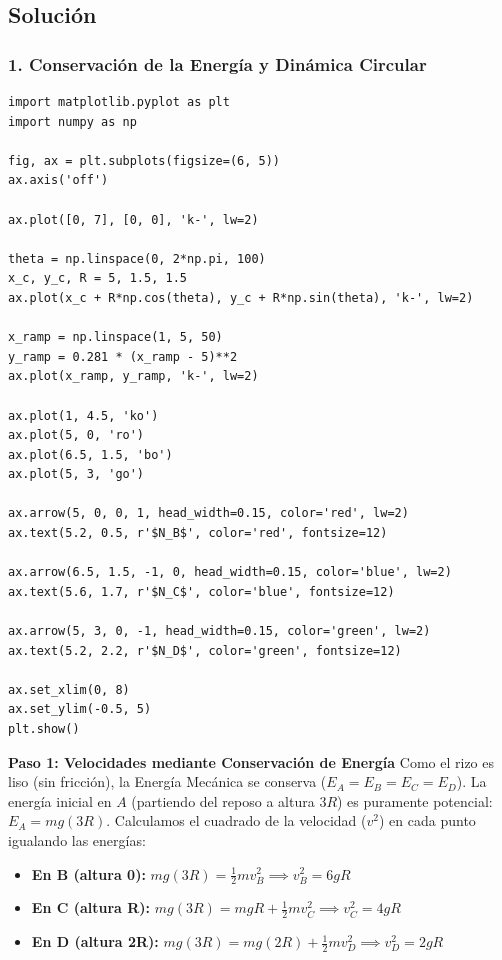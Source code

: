 \documentclass[12pt, a4paper]{article}
\begin{document}
\subsection*{Solución}

\subsubsection*{1. Conservación de la Energía y Dinámica Circular}

\begin{verbatim}
import matplotlib.pyplot as plt
import numpy as np

fig, ax = plt.subplots(figsize=(6, 5))
ax.axis('off')

ax.plot([0, 7], [0, 0], 'k-', lw=2)

theta = np.linspace(0, 2*np.pi, 100)
x_c, y_c, R = 5, 1.5, 1.5
ax.plot(x_c + R*np.cos(theta), y_c + R*np.sin(theta), 'k-', lw=2)

x_ramp = np.linspace(1, 5, 50)
y_ramp = 0.281 * (x_ramp - 5)**2
ax.plot(x_ramp, y_ramp, 'k-', lw=2)

ax.plot(1, 4.5, 'ko')
ax.plot(5, 0, 'ro')
ax.plot(6.5, 1.5, 'bo')
ax.plot(5, 3, 'go')

ax.arrow(5, 0, 0, 1, head_width=0.15, color='red', lw=2)
ax.text(5.2, 0.5, r'$N_B$', color='red', fontsize=12)

ax.arrow(6.5, 1.5, -1, 0, head_width=0.15, color='blue', lw=2)
ax.text(5.6, 1.7, r'$N_C$', color='blue', fontsize=12)

ax.arrow(5, 3, 0, -1, head_width=0.15, color='green', lw=2)
ax.text(5.2, 2.2, r'$N_D$', color='green', fontsize=12)

ax.set_xlim(0, 8)
ax.set_ylim(-0.5, 5)
plt.show()
\end{verbatim}

\textbf{Paso 1: Velocidades mediante Conservación de Energía}
Como el rizo es liso (sin fricción), la Energía Mecánica se conserva ($E_A = E_B = E_C = E_D$).
La energía inicial en $A$ (partiendo del reposo a altura $3R$) es puramente potencial: $E_A = mg(3R)$.
Calculamos el cuadrado de la velocidad ($v^2$) en cada punto igualando las energías:
\begin{itemize}
    \item \textbf{En B (altura 0):} $mg(3R) = \frac{1}{2}mv_B^2 \implies v_B^2 = 6gR$
    \item \textbf{En C (altura R):} $mg(3R) = mgR + \frac{1}{2}mv_C^2 \implies v_C^2 = 4gR$
    \item \textbf{En D (altura 2R):} $mg(3R) = mg(2R) + \frac{1}{2}mv_D^2 \implies v_D^2 = 2gR$
\end{itemize}
\end{document}

